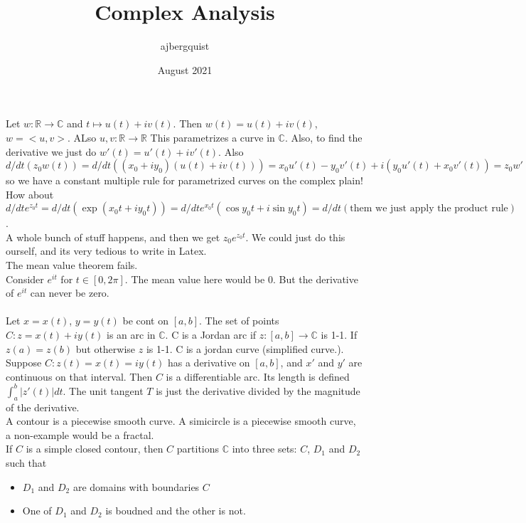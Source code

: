 \documentclass{article}
\title{Complex Analysis}
\author{ajbergquist }
\date{August 2021}
\theoremstyle{definition}
\newcommand{\R}{\mathbb{R}}
\newcommand{\C}{\mathbb{C}}
\begin{document}
 Let $w:\R\rightarrow \C$ and $t\mapsto u(t) + iv(t).$ Then $w(t) = u(t) + iv(t)$, $w = <u,v>$. ALso $u,v:\R\rightarrow \R$ This parametrizes a curve in $\C$. Also, to find the derivative we just do $w'(t) = u'(t) + iv'(t).$ Also $ d/dt(z_0w(t)) = d/dt((x_0 + iy_0)(u(t)+iv(t))) = x_0u'(t) - y_0 v'(t) + i(y_0u'(t) + x_0v'(t)) = z_0w'(t).$\\

 so we have a constant multiple rule for parametrized curves on the complex plain!\\

 How about $d/dt e^{z_0 t} = d/dt(\exp(x_0 t + iy_0t)) = d/dte^{x_0 t}(\cos y_0t + i\sin y_0t) = d/dt(\mbox{them we just apply the product rule})$.\\

A whole bunch of stuff happens, and then we get $z_0 e^{z_0 t}.$ We could just do this ourself, and its very tedious to write in Latex.\\

 The mean value theorem fails.\\

 Consider $e^{it}$ for $t\in [0,2\pi].$ The mean value here would be $0$. But the derivative of $e^{it}$ can never be zero.\\

\\

 Let $x = x(t)$, $y  = y(t)$ be cont on $[a,b]$. The set of points $C : z = x(t) + iy(t)$ is an arc in $\C$. C is a Jordan arc if $z : [a,b] \rightarrow \C$ is 1-1. If $z(a) = z(b)$ but otherwise $z$ is 1-1. C is a jordan curve (simplified curve.).\\

 Suppose $C:z(t) = x(t) = iy(t)$ has a derivative on $[a,b]$, and $x'$ and $y'$ are continuous on that interval. Then $C$ is a differentiable arc. Its length is defined $\int_a^b |z'(t)| dt$. The unit tangent $T$ is just the derivative divided by the magnitude of the derivative. \\

 A contour is a piecewise smooth curve. A simicircle is a piecewise smooth curve, a non-example would be a fractal.\\

 If $C$ is a simple closed contour, then $C$ partitions $\C$ into three sets: $C$, $D_1$ and $D_2$ such that 
\begin{itemize}
    \item $D_1$ and $D_2$ are domains with boundaries $C$
    \item One of $D_1$ and $D_2$ is boudned and the other is not. 
\end{itemize}
\end{document}
